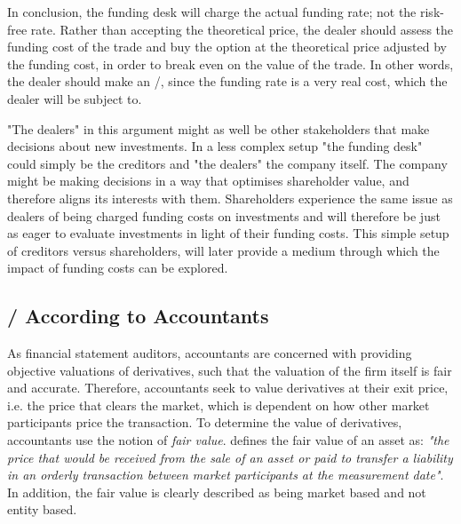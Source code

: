 \documentclass[main.tex]{subfiles}
\begin{document}
            In conclusion, the funding desk will charge the actual funding rate; not the risk-free rate.
            Rather than accepting the theoretical price, the dealer should assess the funding cost of the trade 
            and buy the option at the theoretical price adjusted by the funding cost,
            in order to break even on the value of the trade.
            In other words, the dealer should make an \FVA/, 
            since the funding rate is a very real cost, which the dealer will be subject to.
            
            "The dealers" in this argument might as well be other stakeholders that make decisions about new investments.
            In a less complex setup "the funding desk" could simply be the creditors and "the dealers" the company itself.
            The company might be making decisions in a way that optimises shareholder value,
            and therefore aligns its interests with them.
            Shareholders experience the same issue as dealers of being charged funding costs on investments 
            and will therefore be just as eager to evaluate investments in light of their funding costs.
            This simple setup of creditors versus shareholders, 
            will later provide a medium through which the impact of funding costs can be explored.

        \subsection{\FVA/ According to Accountants}
            As financial statement auditors, accountants are concerned with providing objective valuations of derivatives,
            such that the valuation of the firm itself is fair and accurate.
            Therefore, accountants seek to value derivatives at their exit price, i.e. the price that clears the market,
            which is dependent on how other market participants price the transaction.
            To determine the value of derivatives, accountants use the notion of \textit{fair value}.
            \textcite{IFRS13} defines the fair value of an asset as: 
            \textit{"the price that would be received from the sale of an asset or paid to transfer a liability
            in an orderly transaction between market participants at the measurement date"}.
            In addition, the fair value is clearly described as being market based and not entity based.
\end{document}

